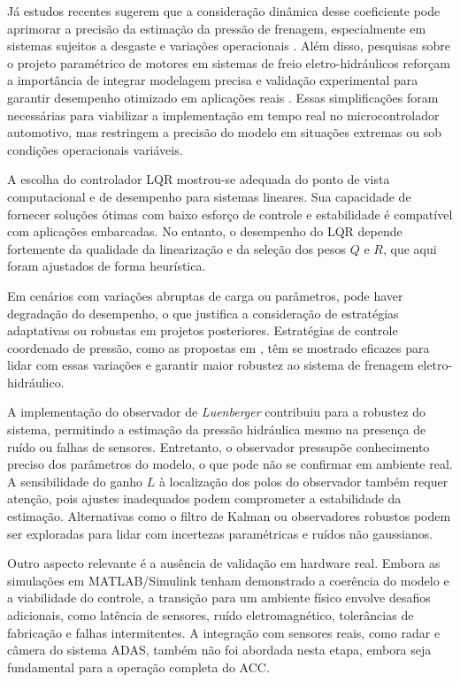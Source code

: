 Já estudos recentes sugerem que a consideração dinâmica desse coeficiente pode aprimorar a precisão da estimação da pressão de frenagem, especialmente em sistemas sujeitos a desgaste e variações operacionais \cite{ZhangWang2021}. Além disso, pesquisas sobre o projeto paramétrico de motores em sistemas de freio eletro-hidráulicos reforçam a importância de integrar modelagem precisa e validação experimental para garantir desempenho otimizado em aplicações reais \cite{MotorParametricDesign2023}. Essas simplificações foram necessárias para viabilizar a implementação em tempo real no microcontrolador automotivo, mas restringem a precisão do modelo em situações extremas ou sob condições operacionais variáveis.

A escolha do controlador LQR mostrou-se adequada do ponto de vista computacional e de desempenho para sistemas lineares. Sua capacidade de fornecer soluções ótimas com baixo esforço de controle e estabilidade é compatível com aplicações embarcadas. No entanto, o desempenho do LQR depende fortemente da qualidade da linearização e da seleção dos pesos $Q$ e $R$, que aqui foram ajustados de forma heurística.

 Em cenários com variações abruptas de carga ou parâmetros, pode haver degradação do desempenho, o que justifica a consideração de estratégias adaptativas ou robustas em projetos posteriores. Estratégias de controle coordenado de pressão, como as propostas em \cite{PressureCoordinatedControl2023}, têm se mostrado eficazes para lidar com essas variações e garantir maior robustez ao sistema de frenagem eletro-hidráulico.

A implementação do observador de \textit{Luenberger} contribuiu para a robustez do sistema, permitindo a estimação da pressão hidráulica mesmo na presença de ruído ou falhas de sensores. Entretanto, o observador pressupõe conhecimento preciso dos parâmetros do modelo, o que pode não se confirmar em ambiente real. A sensibilidade do ganho $L$ à localização dos polos do observador também requer atenção, pois ajustes inadequados podem comprometer a estabilidade da estimação. Alternativas como o filtro de Kalman ou observadores robustos podem ser exploradas para lidar com incertezas paramétricas e ruídos não gaussianos.

Outro aspecto relevante é a ausência de validação em hardware real. Embora as simulações em MATLAB/Simulink tenham demonstrado a coerência do modelo e a viabilidade do controle, a transição para um ambiente físico envolve desafios adicionais, como latência de sensores, ruído eletromagnético, tolerâncias de fabricação e falhas intermitentes. A integração com sensores reais, como radar e câmera do sistema ADAS, também não foi abordada nesta etapa, embora seja fundamental para a operação completa do ACC.

